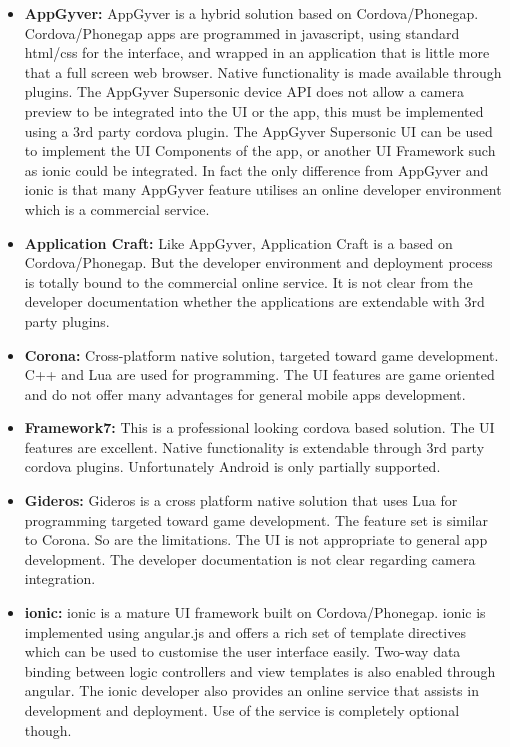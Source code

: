 \begin{itemize}[label={}]
\item \textbf{AppGyver:} AppGyver is a hybrid solution based on Cordova/Phonegap. Cordova/Phonegap apps are programmed in javascript, using standard html/css for the interface, and wrapped in an application that is little more that a full screen web browser. Native functionality is made available through plugins. The AppGyver Supersonic device API does not allow a camera preview to be integrated into the UI or the app, this must be implemented using a 3rd party cordova plugin. The AppGyver Supersonic UI can be used to implement the UI Components of the app, or another UI Framework such as ionic could be integrated. In fact the only difference from AppGyver and ionic is that many AppGyver feature utilises an online developer environment which is a commercial service.

\item \textbf{Application Craft:} Like AppGyver, Application Craft is a based on Cordova/Phonegap. But the developer environment and deployment process is totally bound to the commercial online service. It is not clear from the developer documentation whether the applications are extendable with 3rd party plugins.

\item \textbf{Corona:} Cross-platform native solution, targeted toward game development. C++ and Lua are used for programming. The UI features are game oriented and do not offer many advantages for general mobile apps development.

\item \textbf{Framework7:} This is a professional looking cordova based solution. The UI features are excellent. Native functionality is extendable through 3rd party cordova plugins. Unfortunately Android is only partially supported.

\item \textbf{Gideros:} Gideros is a cross platform native solution that uses Lua for programming targeted toward game development. The feature set is similar to Corona. So are the limitations. The UI is not appropriate to general app development. The developer documentation is not clear regarding camera integration.

\item \textbf{ionic:} ionic is a mature UI framework built on Cordova/Phonegap. ionic is implemented using angular.js and offers a rich set of template directives which can be used to customise the user interface easily. Two-way data binding between logic controllers and view templates is also enabled through angular. The ionic developer also provides an online service that assists in development and deployment. Use of the service is completely optional though.


\end{itemize}
